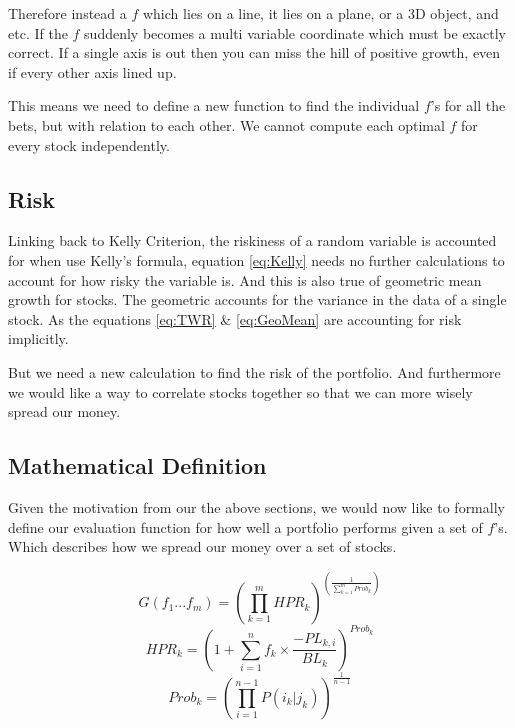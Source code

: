 \documentclass[11pt]{article}
\begin{document}
    Therefore instead a \(f\) which lies on a line, it lies on a plane, or a 3D object, 
    and etc. If the \(f\) suddenly becomes a multi variable coordinate which must be 
    exactly correct. If a single axis is out then you can miss the hill of positive 
    growth, even if every other axis lined up.

    This means we need to define a new function to find the individual \(f\)'s for all the bets,
    but with relation to each other. We cannot compute each optimal \(f\) for every stock
    independently.


\subsection{Risk}

    Linking back to Kelly Criterion, the riskiness of a random variable is accounted for
    when use Kelly's formula, equation \ref{eq:Kelly} needs no further calculations
    to account for how risky the variable is. And this is also true of geometric mean growth
    for stocks. The geometric accounts for the variance in the data of a single stock. As the
    equations \ref{eq:TWR} \& \ref{eq:GeoMean} are accounting for risk implicitly.

    But we need a new calculation to find the risk of the portfolio. And furthermore we would
    like a way to correlate stocks together so that we can more wisely spread our money.

\subsection{Mathematical Definition}

    Given the motivation from our the above sections, we would now like to formally define our
    evaluation function for how well a portfolio performs given a set of \(f\)'s. Which describes
    how we spread our money over a set of stocks.

    \begin{equation}\label{eq:G}
        G(f_1...f_m) = \left( \displaystyle\prod^{m}_{k=1} HPR_k \right) ^{ \left( \displaystyle\frac{1}{\sum^{m}_{k=1}Prob_k} \right)}
    \end{equation}
    \begin{equation}\label{eq:HPR_k}
        HPR_k = \left( 1 +  \displaystyle\sum^{n}_{i=1} f_k \times \frac{- PL_{k,i}}{BL_k} \right) ^{Prob_k}
    \end{equation}
    \begin{equation}\label{eq:Prob_k}
        Prob_k = \left( \displaystyle\prod^{n - 1}_{i=1} P(i_k | j_k)\right)^{\frac{1}{n - 1}}
    \end{equation}
\end{document}
